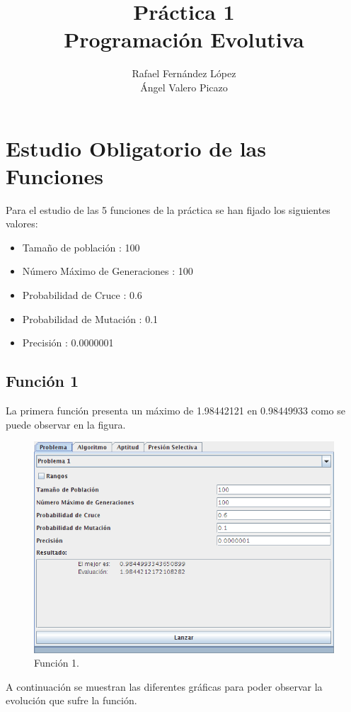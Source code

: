 \documentclass[12pt]{article}
\title{Práctica 1\\Programación Evolutiva}
\author{Rafael Fernández López\\Ángel Valero Picazo}
\date{}
\begin{document}
\maketitle
\newpage
\newpage
\tableofcontents
\newpage

\section{Estudio Obligatorio de las Funciones}	
	Para el estudio de las 5 funciones de la práctica se han fijado los siguientes valores:
	\begin{itemize}
		\item Tamaño de población : 100
		\item Número Máximo de Generaciones : 100
		\item Probabilidad de Cruce : 0.6
		\item Probabilidad de Mutación : 0.1
		\item Precisión : 0.0000001
	\end{itemize}

\subsection{Función 1}
	La primera función presenta un máximo de 1.98442121 en 0.98449933 como se puede observar en la figura.
\begin{figure}[H]
\centering
\includegraphics[scale=0.5]{graficas/F1inicial}
\caption{Función 1.}
\label{fig}
\end{figure}
	A continuación se muestran las diferentes gráficas para poder observar la evolución que sufre la función.
\end{document}
